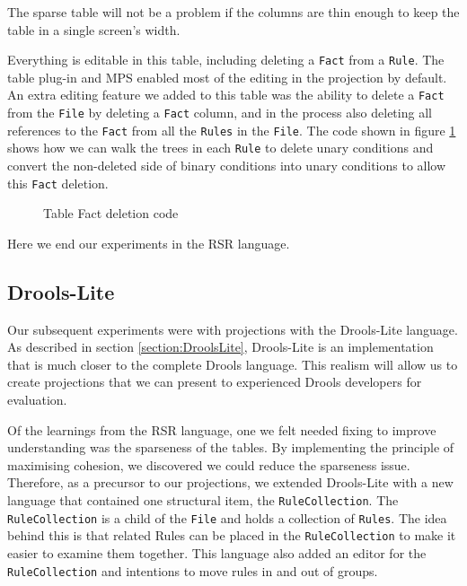 The sparse table will not be a problem if the columns are thin enough to keep the table in a single screen's width.

Everything is editable in this table, including deleting a \texttt{Fact} from a \texttt{Rule}.
The table plug-in and MPS enabled most of the editing in the projection by default.
An extra editing feature we added to this table was the ability to delete a \texttt{Fact} from the \texttt{File} by deleting a \texttt{Fact} column, and in the process also deleting all references to the \texttt{Fact} from all the \texttt{Rules} in the \texttt{File}.
The code shown in figure \ref{fig:tableFactDeletion} shows how we can walk the trees in each \texttt{Rule} to delete unary conditions and convert the non-deleted side of binary conditions into unary conditions to allow this \texttt{Fact} deletion.

\begin{figure}[h]
    \centering
    \caption{Table Fact deletion code}
    \label{fig:tableFactDeletion}
\end{figure}

Here we end our experiments in the RSR language.

\subsection{Drools-Lite}

Our subsequent experiments were with projections with the Drools-Lite language.
As described in section \ref{section:DroolsLite}, Drools-Lite is an implementation that is much closer to the complete Drools language.
This realism will allow us to create projections that we can present to experienced Drools developers for evaluation.

Of the learnings from the RSR language, one we felt needed fixing to improve understanding was the sparseness of the tables.
By implementing the principle of maximising cohesion, we discovered we could reduce the sparseness issue.
Therefore, as a precursor to our projections, we extended Drools-Lite with a new language that contained one structural item, the \texttt{RuleCollection}.
The \texttt{RuleCollection} is a child of the \texttt{File} and holds a collection of \texttt{Rules}.
The idea behind this is that related Rules can be placed in the \texttt{RuleCollection} to make it easier to examine them together.
This language also added an editor for the \texttt{RuleCollection} and intentions to move rules in and out of groups.

